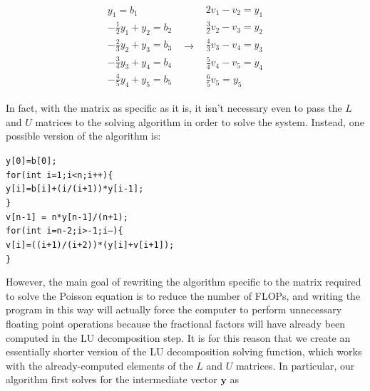 \documentclass[12pt]{article}
\numberwithin{equation}{section}
\begin{document}
\begin{equation}
\label{eq:easylusolver}
\begin{array}{ccc}
\begin{array}{c}
y_{1}=b_{1} \\
-\frac{1}{2}y_{1}+y_{2}=b_{2} \\
-\frac{2}{3}y_{2}+y_{3}=b_{3} \\
-\frac{3}{4}y_{3}+y_{4}=b_{4} \\
-\frac{4}{5}y_{4}+y_{5}=b_{5}
\end{array} & \rightarrow &
\begin{array}{c}
2v_{1}-v_{2}=y_{1} \\
\frac{3}{2}v_{2}-v_{3}=y_{2} \\
\frac{4}{3}v_{3}-v_{4}=y_{3} \\
\frac{5}{4}v_{4}-v_{5}=y_{4} \\
\frac{6}{5}v_{5}=y_{5}
\end{array}
\end{array}
\end{equation}
\vspace{.2cm}

\noindent In fact, with the matrix as specific as it is, it isn't necessary even to pass the $L$ and $U$ matrices to the solving algorithm in order to solve the system.  Instead, one possible version of the algorithm is:

\vspace{.4cm}
\begin{1stlisting}
\texttt{y[0]=b[0]; \\ \indent for(int i=1;i<n;i++)\{ \\ \indent\indent y[i]=b[i]+(i/(i+1))*y[i-1]; \\\indent \} \\\indent v[n-1] = n*y[n-1]/(n+1); \\ \indent
for(int i=n-2;i>-1;i--)\{ \\\indent \indent v[i]=((i+1)/(i+2))*(y[i]+v[i+1]); \\\indent \}}
\end{1stlisting}
\vspace{.4cm}

\noindent However, the main goal of rewriting the algorithm specific to the matrix required to solve the Poisson equation is to reduce the number of FLOPs, and writing the program in this way will actually force the computer to perform unnecessary floating point operations because the fractional factors will have already been computed in the LU decomposition step.  It is for this reason that we create an essentially shorter version of the LU decomposition solving function, which works with the already-computed elements of the $L$ and $U$ matrices.  In particular, our algorithm first solves for the intermediate vector $\textbf{y}$ as 
\end{document}
